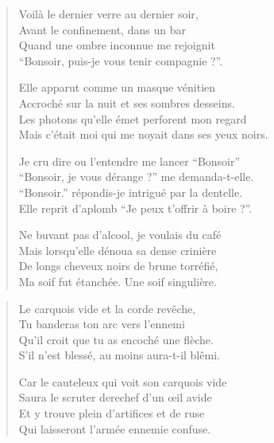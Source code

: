 \begin{verse}\quatrain%
  Voilà le dernier verre au dernier soir,\\  
  Avant le confinement, dans un bar\\ 
  Quand une ombre inconnue me rejoignit\\ 
  \enquote{\newcharacterspeaks{}Bonsoir, puis-je vous tenir compagnie ?}. %

  Elle apparut  comme un masque vénitien\\ 
  Accroché sur la nuit et ses sombres desseins.\\ 
  Les photons qu’elle émet perforent mon regard\\ 
  Mais c’était moi qui me noyait dans ses yeux noirs. %

  Je cru dire ou l’entendre me lancer \enquote{\newcharacterspeaks{}Bonsoir}\\ 
  \enquote{\newcharacterspeaks{}Bonsoir, je vous dérange ?} me demanda-t-elle.\\ 
  \enquote{\newcharacterspeaks{}Bonsoir.} répondis-je intrigué par la dentelle.\\ 
  Elle reprit d’aplomb \enquote{\newcharacterspeaks{}Je peux t’offrir à boire ?}. %

  Ne buvant pas d’alcool, je voulais du café\\ 
  Mais lorsqu’elle dénoua sa dense crinière\\ 
  De longs  cheveux noirs de brune torréfié,\\ 
  Ma soif fut étanchée. Une soif singulière. %
\end{verse}

\begin{verse}\quatrain
  Le carquois vide et la corde revêche,\\ 
  Tu banderas ton arc vers l’ennemi\\ 
  Qu’il croit que tu as encoché une flèche.\\ 
  S’il n’est blessé, au moins aura-t-il blêmi.  %

  Car le cauteleux qui voit son carquois vide\\ 
  Saura le scruter derechef d’un œil avide\\ 
  Et y trouve plein d’artifices et de ruse\\ 
  Qui laisseront l’armée ennemie confuse.  %
\end{verse}

